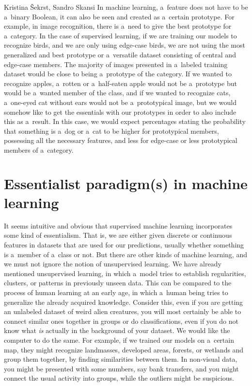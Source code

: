 \begin{artengenv2auth}{Kristina Šekrst, Sandro Skansi}
In machine learning, a~feature does not have to be a~binary Boolean, it can also be seen and created as a~certain prototype. For example, in image recognition, there is a~need to give the best prototype for a~category. In the case of supervised learning, if we are training our models to recognize birds, and we are only using edge-case birds, we are not using the most generalized and best prototype or a~versatile dataset consisting of central and edge-case members. The majority of images presented in a~labeled training dataset would be close to being a~prototype of the category. If we wanted to recognize apples, a~rotten or a~half-eaten apple would not be a~prototype but would be a~wanted member of the class, and if we wanted to recognize cats, a~one-eyed cat without ears would not be a~prototypical image, but we would somehow like to get the essentials with our prototypes in order to also include this as a~result. In this case, we would expect percentages stating the probability that something is a~dog or a~cat to be higher for prototypical members, possessing all the necessary features, and less for edge-case or less prototypical members of a~category.

\section{Essentialist paradigm(s) in machine learning}
It seems intuitive and obvious that supervised machine learning incorporates some kind of essentialism. That is, we are either given discrete or continuous features in datasets that are used for our predictions, usually whether something is a~member of a~class or not. But there are other kinds of machine learning, and we must not ignore the notion of unsupervised learning. We have already mentioned unsupervised learning, in which a~model tries to establish regularities, clusters, or patterns in previously unseen data. This can be compared to the process of human learning at an early age, in which a~human being tries to generalize the already acquired knowledge. Consider this, even if you are getting an unlabeled dataset of weird alien creatures, you will most certainly be able to connect similar ones together in groups or do classifications, even if you do not know what \textit{is} actually in the background of your dataset. We would like the computer to do the same. For example, if we trained our models on a~certain map, they might recognize landmasses, developed areas, forests, or wetlands and group them together, by finding similarities between them. In non-visual data, you might be presented with some numbers, say bank transfers, and you might connect the usual activity into groups, while the outliers might be suspicious.


\end{artengenv2auth}
